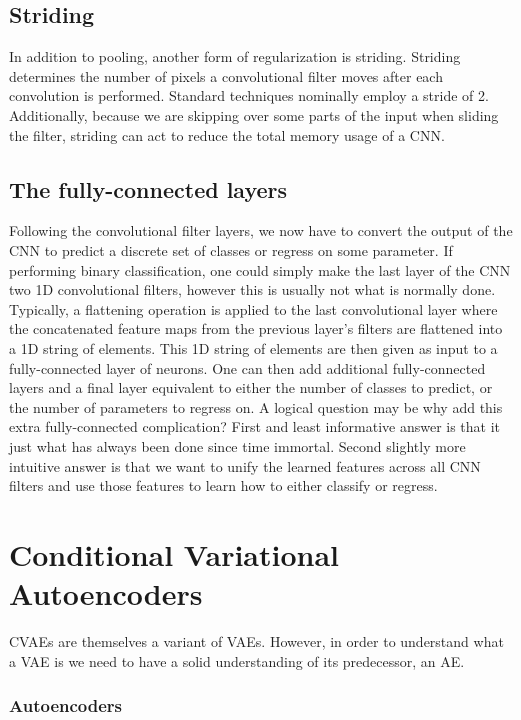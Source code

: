 \subsection{Striding}
In addition to pooling, another form of regularization is 
striding. Striding determines the number of pixels a 
convolutional filter moves after each convolution 
is performed. Standard techniques nominally employ 
a stride of 2. Additionally, because we are skipping 
over some parts of the input when sliding the filter, 
striding can act to reduce the total memory usage of a 
\ac{CNN}.

\subsection{The fully-connected layers}

Following the convolutional filter layers, we now 
have to convert the output of the CNN to predict 
a discrete set of classes or regress on some parameter. 
If performing binary classification, one could simply 
make the last layer of the \ac{CNN} two 1D convolutional 
filters, however this is usually not what is normally 
done. Typically, a flattening operation is applied 
to the last convolutional layer where the concatenated 
feature maps from the previous layer's filters 
are flattened into a 1D string of elements. This 1D 
string of elements are then given as input to 
a fully-connected layer of neurons. One can then add 
additional fully-connected layers and a final 
layer equivalent to either the number of classes to 
predict, or the number of parameters to regress on. 
A logical question may be why add this extra 
fully-connected complication? First and least 
informative answer is that it just what has 
always been done since time immortal. Second 
slightly more intuitive answer is that we want 
to unify the learned features across all 
\ac{CNN} filters and use those features to learn 
how to either classify or regress.


\section{Conditional Variational Autoencoders}

\ac{CVAE}s are themselves a variant of 
\ac{VAE}s. However, in order to understand what a \ac{VAE} 
is we need to have a solid understanding of its predecessor, 
an \ac{AE}.


%
%
\subsubsection{Autoencoders}

